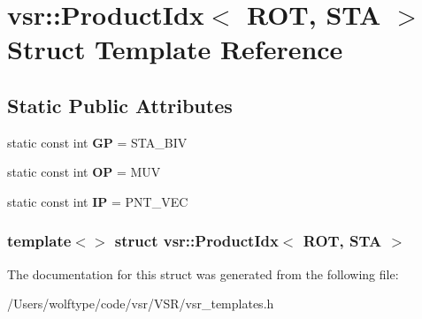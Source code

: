 \hypertarget{structvsr_1_1_product_idx_3_01_r_o_t_00_01_s_t_a_01_4}{\section{vsr\-:\-:Product\-Idx$<$ R\-O\-T, S\-T\-A $>$ Struct Template Reference}
\label{structvsr_1_1_product_idx_3_01_r_o_t_00_01_s_t_a_01_4}
}
\subsection*{Static Public Attributes}
\begin{DoxyCompactItemize}
\item 
\hypertarget{structvsr_1_1_product_idx_3_01_r_o_t_00_01_s_t_a_01_4_ae345ea89124b770d5201eb85d3539a27}{static const int {\bfseries G\-P} = S\-T\-A\-\_\-\-B\-I\-V}\label{structvsr_1_1_product_idx_3_01_r_o_t_00_01_s_t_a_01_4_ae345ea89124b770d5201eb85d3539a27}

\item 
\hypertarget{structvsr_1_1_product_idx_3_01_r_o_t_00_01_s_t_a_01_4_aa186a4e8bb2448b665a58784915b2296}{static const int {\bfseries O\-P} = M\-U\-V}\label{structvsr_1_1_product_idx_3_01_r_o_t_00_01_s_t_a_01_4_aa186a4e8bb2448b665a58784915b2296}

\item 
\hypertarget{structvsr_1_1_product_idx_3_01_r_o_t_00_01_s_t_a_01_4_a872ddb6b90fd82602bb28483713372c2}{static const int {\bfseries I\-P} = P\-N\-T\-\_\-\-V\-E\-C}\label{structvsr_1_1_product_idx_3_01_r_o_t_00_01_s_t_a_01_4_a872ddb6b90fd82602bb28483713372c2}

\end{DoxyCompactItemize}
\subsubsection*{template$<$$>$ struct vsr\-::\-Product\-Idx$<$ R\-O\-T, S\-T\-A $>$}



The documentation for this struct was generated from the following file\-:\begin{DoxyCompactItemize}
\item 
/\-Users/wolftype/code/vsr/\-V\-S\-R/vsr\-\_\-templates.\-h\end{DoxyCompactItemize}
